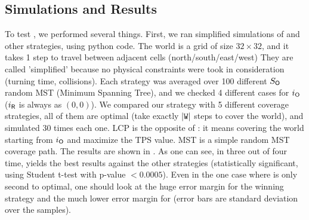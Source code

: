 \documentclass[letterpaper, 10 pt, conference]{ieeeconf}  %
\theoremstyle{definition}
\newcommand{\rob}{{{\sf R}}\xspace}
\newcommand{\opp}{{{\sf O}}\xspace}
\newcommand{\w}{{{\texttt W}}\xspace}
\newcommand{\ltr}{{{\sf{LTR}}}\xspace}
\DeclarePairedDelimiter\abs{\lvert}{\rvert}%
\begin{document}
\subsection{Simulations and Results}
To test \ltr, we performed several things. First, we ran simplified simulations of \ltr and other strategies, using python code. The world is a grid of size $32\times 32$, and it takes 1 step to travel between adjacent cells (north/south/east/west)%
They are called 'simplified' because no physical constraints were took in consideration (turning time, collisions). Each strategy was averaged over 100 different $S_\opp$ random MST (Minimum Spanning Tree), and we checked 4 different cases for $i_\opp$ ($i_\rob$ is always as $(0,0)$). We compared our strategy with 5 different coverage strategies, all of them are optimal (take exactly $\abs*{\w}$ steps to cover the world), and simulated 30 times each one. %
LCP is the opposite of \ltr: it means covering the world starting from $i_\opp$ and maximize the TPS value.  MST is a simple random MST coverage path.
The results are shown in . As one can see, in three out of four time, \ltr yields the best results against the other strategies (statistically significant, using Student t-test with p-value $<0.0005$).
Even in the one case where \ltr is only second to optimal, one should look at the huge error margin for the winning strategy and the much lower error margin for \ltr (error bars are standard deviation over the samples).
\end{document}
